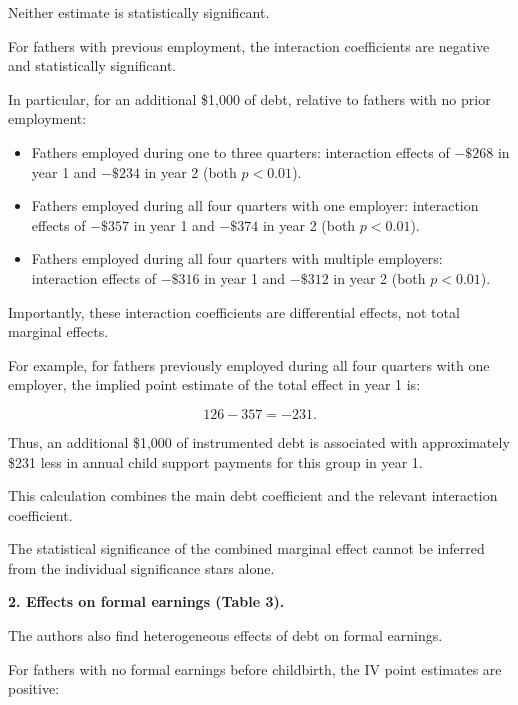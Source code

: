 \documentclass{article}
\begin{document}
Neither estimate is statistically
significant.

For fathers with previous employment,
the interaction coefficients are
negative and statistically significant.

In particular, for an additional
\$1,000 of debt, relative to fathers
with no prior employment:

\begin{itemize}

    \item Fathers employed during
    one to three quarters:
    interaction effects of
    $-\$268$ in year 1 and
    $-\$234$ in year 2
    (both $p<0.01$).

    \item Fathers employed during
    all four quarters with one
    employer:
    interaction effects of
    $-\$357$ in year 1 and
    $-\$374$ in year 2
    (both $p<0.01$).

    \item Fathers employed during
    all four quarters with multiple
    employers:
    interaction effects of
    $-\$316$ in year 1 and
    $-\$312$ in year 2
    (both $p<0.01$).

\end{itemize}

Importantly, these interaction
coefficients are differential effects,
not total marginal effects.

For example, for fathers previously
employed during all four quarters
with one employer, the implied
point estimate of the total effect
in year 1 is:

\begin{equation}
126 - 357 = -231.
\end{equation}

Thus, an additional \$1,000 of
instrumented debt is associated
with approximately \$231 less
in annual child support payments
for this group in year 1.

This calculation combines the
main debt coefficient and the
relevant interaction coefficient.

The statistical significance of
the combined marginal effect
cannot be inferred from the
individual significance stars alone.

\medskip

\noindent
\textbf{2. Effects on formal earnings
(Table 3).}

The authors also find heterogeneous
effects of debt on formal earnings.

For fathers with no formal earnings
before childbirth, the IV point
estimates are positive:
\end{document}

